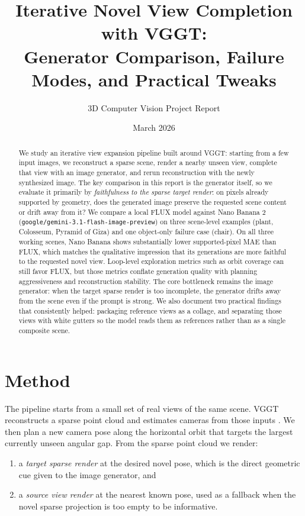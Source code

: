 \documentclass[11pt]{article}
\title{Iterative Novel View Completion with VGGT:\\Generator Comparison, Failure Modes, and Practical Tweaks}
\author{3D Computer Vision Project Report}
\date{March 2026}
\begin{document}
\maketitle

\begin{abstract}
We study an iterative view expansion pipeline built around VGGT: starting from a few input images, we reconstruct a sparse scene, render a nearby unseen view, complete that view with an image generator, and rerun reconstruction with the newly synthesized image. The key comparison in this report is the generator itself, so we evaluate it primarily by \emph{faithfulness to the sparse target render}: on pixels already supported by geometry, does the generated image preserve the requested scene content or drift away from it? We compare a local FLUX model against Nano Banana 2 (\texttt{google/gemini-3.1-flash-image-preview}) on three scene-level examples (plant, Colosseum, Pyramid of Giza) and one object-only failure case (chair). On all three working scenes, Nano Banana shows substantially lower supported-pixel MAE than FLUX, which matches the qualitative impression that its generations are more faithful to the requested novel view. Loop-level exploration metrics such as orbit coverage can still favor FLUX, but those metrics conflate generation quality with planning aggressiveness and reconstruction stability. The core bottleneck remains the image generator: when the target sparse render is too incomplete, the generator drifts away from the scene even if the prompt is strong. We also document two practical findings that consistently helped: packaging reference views as a collage, and separating those views with white gutters so the model reads them as references rather than as a single composite scene.
\end{abstract}

\section{Method}
The pipeline starts from a small set of real views of the same scene. VGGT reconstructs a sparse point cloud and estimates cameras from those inputs \citep{wang2025vggt}. We then plan a new camera pose along the horizontal orbit that targets the largest currently unseen angular gap. From the sparse point cloud we render:
\begin{enumerate}
  \item a \emph{target sparse render} at the desired novel pose, which is the direct geometric cue given to the image generator, and
  \item a \emph{source view render} at the nearest known pose, used as a fallback when the novel sparse projection is too empty to be informative.
\end{enumerate}
\end{document}
